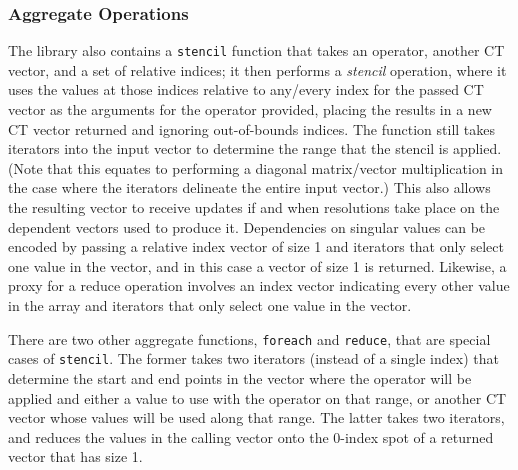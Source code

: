 \documentclass[pageno]{jpaper}
\begin{document}
\subsubsection{Aggregate Operations}
The library also contains a \texttt{stencil} function that takes an operator,
another CT vector, and a set of relative indices; it then performs a 
\textit{stencil} operation, where it uses the values at those indices relative to
any/every index for the passed CT vector as the arguments for the operator
provided, placing the results in a new CT vector returned and ignoring
out-of-bounds indices. The function still takes iterators into the input vector
to determine the range that the stencil is applied. (Note that this equates to
performing a diagonal matrix/vector multiplication in the case where the iterators
delineate the entire input vector.) This also allows the resulting vector to
receive updates if and when resolutions take place on the dependent vectors used
to produce it. Dependencies on singular values can be encoded by passing a
relative index vector of size 1 and iterators that only select one value in the
vector, and in this case a vector of size 1 is returned. Likewise, a proxy for a
reduce operation involves an index vector indicating every other value in the
array and iterators that only select one value in the vector.

There are two other aggregate functions, \texttt{foreach} and \texttt{reduce}, that are
special cases of \texttt{stencil}. The
former takes two iterators (instead of a single index) that determine the start
and end points in the vector where the operator will be applied and either a value to use 
with the operator on that range, or another CT vector whose values will be used along 
that range. The latter takes two iterators, and reduces the values in the calling 
vector onto the 0-index spot of a returned vector that has size 1.
\end{document}
